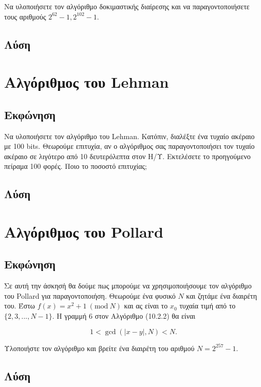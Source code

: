 \documentclass[oneside]{article}
\newcommand{\Mod}[1]{\ (\mathrm{mod}\ #1)}
\begin{document}
Να υλοποιήσετε τον αλγόριθμο δοκιμαστικής διαίρεσης και να παραγοντοποιήσετε τους αριθμούς $2^{62} - 1, 2^{102} - 1$.

\subsection{Λύση} 

\section{Αλγόριθμος του Lehman}

\subsection{Εκφώνηση} 

Να υλοποιήσετε τον αλγόριθμο του Lehman. Κατόπιν, διαλέξτε ένα τυχαίο ακέραιο με 100 bits. Θεωρούμε επιτυχία, αν ο αλγόριθμος σας παραγοντοποιήσει τον τυχαίο ακέραιο σε λιγότερο από 10 δευτερόλεπτα στον Η/Υ. Εκτελέσετε το προηγούμενο πείραμα 100 φορές. Ποιο το ποσοστό επιτυχίας;

\subsection{Λύση}

\section{Αλγόριθμος του Pollard}

\subsection{Εκφώνηση} 

Σε αυτή την άσκησή θα δούμε πως μπορούμε να χρησιμοποιήσουμε τον αλγόριθμο του Pollard για παραγοντοποιήση. Θεωρούμε ένα φυσικό $N$ και ζητάμε ένα διαιρέτη του. Έστω $f(x) = x^2 + 1 \Mod{N}$ και ας είναι το $x_0$ τυχαία τιμή από το $\{
2, 3, ..., N - 1\}$. Η γραμμή 6 στον Αλγόριθμο (10.2.2) θα είναι

\[
    1 < \gcd(|x - y|, N) < N.
\]

Υλοποιήστε τον αλγόριθμο και βρείτε ένα διαιρέτη του αριθμού $N = 2^{257} - 1$.

\subsection{Λύση}
\end{document}

